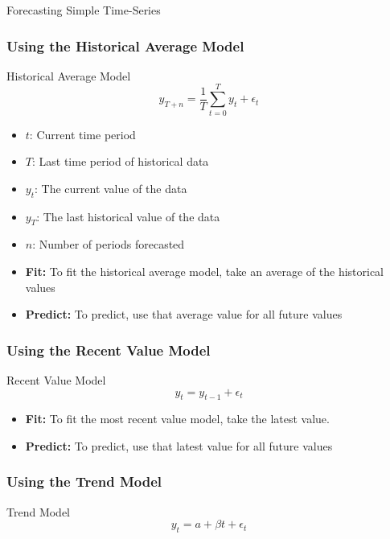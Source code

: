 \documentclass[handout, 11pt]{beamer}
\begin{document}
\begin{section}{Forecasting Simple Time-Series}
\begin{frame}
\frametitle{Using the Historical Average Model}
\begin{block}{Historical Average Model}
\begin{equation}
	y_{T + n} = \frac{1}{T} \sum_{t=0}^T y_t + \epsilon_t
\end{equation}
\vspace{-0.3cm}
\begin{itemize}
\item $t$: Current time period
\item $T$: Last time period of historical data
\item $y_t$: The current value of the data
\item $y_T$: The last historical value of the data
\item $n$: Number of periods forecasted
\end{itemize}
\end{block}
\vfill
\begin{itemize}
\item \textbf{Fit:}
To fit the historical average model, take an average of the historical values
\vfill
\item \textbf{Predict:}
To predict, use that average value for all future values
\end{itemize}
\end{frame}
\begin{frame}
\frametitle{Using the Recent Value Model}
\begin{block}{Recent Value Model}
\begin{equation}
	y_t = y_{t-1} + \epsilon_t
\end{equation}
\end{block}
\vfill
\begin{itemize}
\item \textbf{Fit:}
To fit the most recent value model, take the latest value.
\vfill
\item \textbf{Predict:}
To predict, use that latest value for all future values
\end{itemize}
\end{frame}
\begin{frame}
\frametitle{Using the Trend Model}
\begin{block}{Trend Model}
\begin{equation}
	y_t = a + \beta t + \epsilon_t
\end{equation}
\end{block}

\end{frame}
\end{section}
\end{document}
